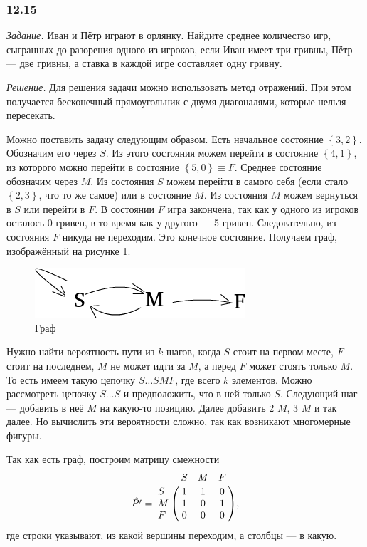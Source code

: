 \subsubsection*{12.15}

\textit{Задание.} Иван и Пётр играют в орлянку.
Найдите среднее количество игр, сыгранных до разорения одного из игроков, если Иван имеет три гривны, Пётр --- две гривны, а ставка в каждой игре составляет одну гривну.

\textit{Решение.} Для решения задачи можно использовать метод отражений.
При этом получается бесконечный прямоугольник с двумя диагоналями, которые нельзя пересекать.

Можно поставить задачу следующим образом.
Есть начальное состояние $ \left\{ 3, 2 \right\} $.
Обозначим его через $S$.
Из этого состояния можем перейти в состояние $ \left\{ 4, 1 \right\} $, из которого можно перейти в состояние $ \left\{ 5, 0 \right\} \equiv F$.
Среднее состояние обозначим через $M$.
Из состояния $S$ можем перейти в самого себя (если стало $ \left\{ 2, 3 \right\} $, что то же самое) или в состояние $M$.
Из состояния $M$ можем вернуться в $S$ или перейти в $F$.
В состоянии $F$ игра закончена, так как у одного из игроков осталось 0 гривен, в то время как у другого --- 5 гривен.
Следовательно, из состояния $F$ никуда не переходим.
Это конечное состояние.
Получаем граф, изображённый на рисунке \ref{fig:1215}.

\begin{figure}[h!]
  \centering
  \includegraphics[width=.6\textwidth]{./pictures/12_15.png}
  \caption{Граф}
  \label{fig:1215}
\end{figure}

Нужно найти вероятность пути из $k$ шагов, когда $S$ стоит на первом месте, $F$ стоит на последнем, $M$ не может идти за $M$, а перед $F$ может стоять только $M$.
То есть имеем такую цепочку $S \dotsc SMF$, где всего $k$ элементов.
Можно рассмотреть цепочку $S \dotsc S$ и предположить, что в ней только $S$.
Следующий шаг --- добавить в неё $M$ на какую-то позицию.
Далее добавить 2 $M$, 3 $M$ и так далее.
Но вычислить эти вероятности сложно, так как возникают многомерные фигуры.

Так как есть граф, построим матрицу смежности
$$ \hat{P'} =
\bordermatrix{~ & S & M & F \cr
              S & 1 & 1 & 0 \cr
              M & 1 & 0 & 1 \cr
	      F & 0 & 0 & 0 \cr },$$
где строки указывают, из какой вершины переходим, а столбцы --- в какую.

